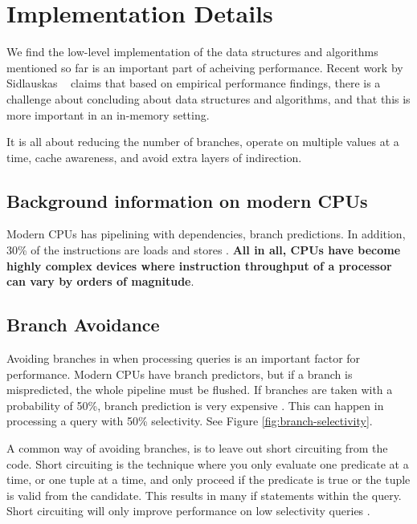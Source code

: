 \chapter{Implementation Details}
\label{chap:Implementation Details}
We find the low-level implementation of the data structures and algorithms mentioned so far is an important part of acheiving performance. Recent work by Sidlauskas \ea~\cite{Sidlauskas2014-ef} claims that based on empirical performance findings, there is a challenge about concluding about data structures and algorithms, and that this is more important in an in-memory setting.

It is all about reducing the number of branches, operate on multiple values at a time, cache awareness, and avoid extra layers of indirection.
\newpage

\section{Background information on modern CPUs}
\label{sec:Background information on modern CPUs}
Modern CPUs has pipelining with dependencies, branch predictions. In addition, 30\% of the instructions are loads and stores \cite{Boncz2005-wj}. \textbf{All in all, CPUs have become highly complex devices where instruction throughput of a processor can vary by orders of magnitude}. 

\section{Branch Avoidance}
\label{sec:Branch Avoidance}
Avoiding branches in when processing queries is an important factor for performance. Modern CPUs have branch predictors, but if a branch is mispredicted, the whole pipeline must be flushed. If branches are taken with a probability of 50\%, branch prediction is very expensive \cite{Neumann2011-uq}. This can happen in processing a query with 50\% selectivity. See Figure \ref{fig:branch-selectivity}.

A common way of avoiding branches, is to leave out short circuiting from the code. Short circuiting is the technique where you only evaluate one predicate at a time, or one tuple at a time, and only proceed if the predicate is true or the tuple is valid from the candidate. This results in many if statements within the query. Short circuiting will only improve performance on low selectivity queries \cite{Johnson2008-cp}.

